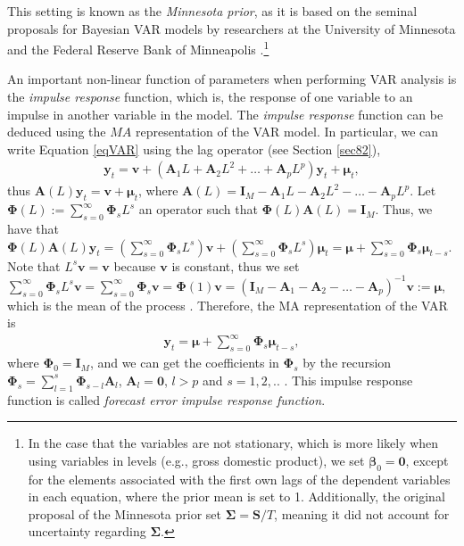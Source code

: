 This setting is known as the \textit{Minnesota prior}, as it is based on the seminal proposals for Bayesian VAR models by researchers at the University of Minnesota and the Federal Reserve Bank of Minneapolis \cite{doan1984forecasting, litterman1986forecasting}.\footnote{In the case that the variables are not stationary, which is more likely when using variables in levels (e.g., gross domestic product), we set $\bm{\beta}_0 = \bm{0}$, except for the elements associated with the first own lags of the dependent variables in each equation, where the prior mean is set to 1. Additionally, the original proposal of the Minnesota prior set $\bm{\Sigma} = \bm{S}/T$, meaning it did not account for uncertainty regarding $\bm{\Sigma}$.}

An important non-linear function of parameters when performing VAR analysis is the \textit{impulse response} function, which is, the response of one variable to an impulse in another variable in the model. The \textit{impulse response} function can be deduced using the $MA$ representation of the VAR model. In particular, we can write Equation \ref{eqVAR} using the lag operator (see Section \ref{sec82}),
\begin{align}\label{eqVAR1}
	\bm{y}_t=\bm{v} + (\bm{A}_{1}L+\bm{A}_{2}L^2+\dots+\bm{A}_{p}L^p)\bm{y}_t+\bm{\mu}_t,
\end{align}
thus $\bm{A}(L)\bm{y}_t=\bm{v}+\bm{\mu}_t$, where $\bm{A}(L)=\bm{I}_M-\bm{A}_{1}L-\bm{A}_{2}L^2-\dots-\bm{A}_{p}L^p$. Let $\bm{\Phi}(L):= \sum_{s=0}^{\infty}\bm{\Phi}_sL^s$ an operator such that $\bm{\Phi}(L)\bm{A}(L)=\bm{I}_M$. Thus, we have that  $\bm{\Phi}(L)\bm{A}(L)\bm{y}_t=\left(\sum_{s=0}^{\infty}\bm{\Phi}_sL^s\right)\bm{v}+\left(\sum_{s=0}^{\infty}\bm{\Phi}_sL^s\right)\bm{\mu}_{t}=\bm{\mu}+\sum_{s=0}^{\infty}\bm{\Phi}_s\bm{\mu}_{t-s}$. Note that $L^s\bm{v}=\bm{v}$ because $\bm{v}$ is constant, thus we set $\sum_{s=0}^{\infty}\bm{\Phi}_sL^s\bm{v}=\sum_{s=0}^{\infty}\bm{\Phi}_s\bm{v}=\bm{\Phi}(1)\bm{v}=(\bm{I}_M-\bm{A}_{1}-\bm{A}_{2}-\dots-\bm{A}_{p})^{-1}\bm{v}:=\bm{\mu}$, which is the mean of the process \cite[Chap.~2]{helmut2005new}. Therefore, the MA representation of the VAR is
\begin{align}\label{eqMA}
	\bm{y}_t=\bm{\mu} + \sum_{s=0}^{\infty}\bm{\Phi}_s\bm{\mu}_{t-s},
\end{align}
where $\bm{\Phi}_0=\bm{I}_M$, and we can get the coefficients in $\bm{\Phi}_s$ by the recursion $\bm{\Phi}_s=\sum_{l=1}^s\bm{\Phi}_{s-l}\bm{A}_l$, $\bm{A}_l=\bm{0}$, $l>p$ and $s=1,2,..$ \cite[Chap.~2]{helmut2005new}. This impulse response function is called \textit{forecast error impulse response function}.

